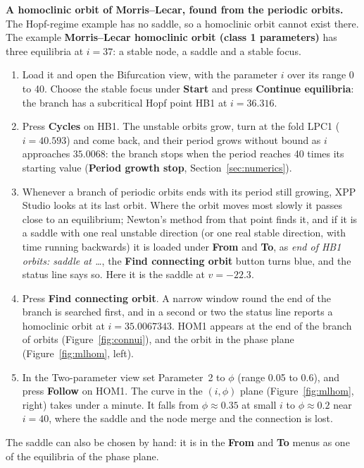 \documentclass[11pt,a4paper]{article}
\newcommand{\XS}{\textsf{XPP Studio}}
\newcommand{\ui}[1]{\textsf{\textbf{#1}}}          %
\begin{document}
\begin{tryit}
\textbf{A homoclinic orbit of Morris--Lecar, found from the periodic orbits.} The Hopf-regime example has no saddle, so a homoclinic orbit cannot exist there. The example \ui{Morris--Lecar homoclinic orbit (class 1 parameters)} has three equilibria at $i=37$: a stable node, a saddle and a stable focus.
\begin{enumerate}
  \item Load it and open the Bifurcation view, with the parameter $i$ over its range 0 to 40. Choose the stable focus under \ui{Start} and press \ui{Continue equilibria}: the branch has a subcritical Hopf point HB1 at $i=36.316$.
  \item Press \ui{Cycles} on HB1. The unstable orbits grow, turn at the fold LPC1 ($i=40.593$) and come back, and their period grows without bound as $i$ approaches $35.0068$: the branch stops when the period reaches 40 times its starting value (\ui{Period growth stop}, Section~\ref{sec:numerics}).
  \item Whenever a branch of periodic orbits ends with its period still growing, \XS{} looks at its last orbit. Where the orbit moves most slowly it passes close to an equilibrium; Newton's method from that point finds it, and if it is a saddle with one real unstable direction (or one real stable direction, with time running backwards) it is loaded under \ui{From} and \ui{To}, as \emph{end of HB1 orbits: saddle at \ldots}, the \ui{Find connecting orbit} button turns blue, and the status line says so. Here it is the saddle at $v=-22.3$.
  \item Press \ui{Find connecting orbit}. A narrow window round the end of the branch is searched first, and in a second or two the status line reports a homoclinic orbit at $i=35.0067343$. HOM1 appears at the end of the branch of orbits (Figure~\ref{fig:connui}), and the orbit in the phase plane (Figure~\ref{fig:mlhom}, left).
  \item In the Two-parameter view set Parameter~2 to $\phi$ (range 0.05 to 0.6), and press \ui{Follow} on HOM1. The curve in the $(i,\phi)$ plane (Figure~\ref{fig:mlhom}, right) takes under a minute. It falls from $\phi\approx0.35$ at small $i$ to $\phi\approx0.2$ near $i=40$, where the saddle and the node merge and the connection is lost.
\end{enumerate}
The saddle can also be chosen by hand: it is in the \ui{From} and \ui{To} menus as one of the equilibria of the phase plane.


\end{tryit}
\end{document}
